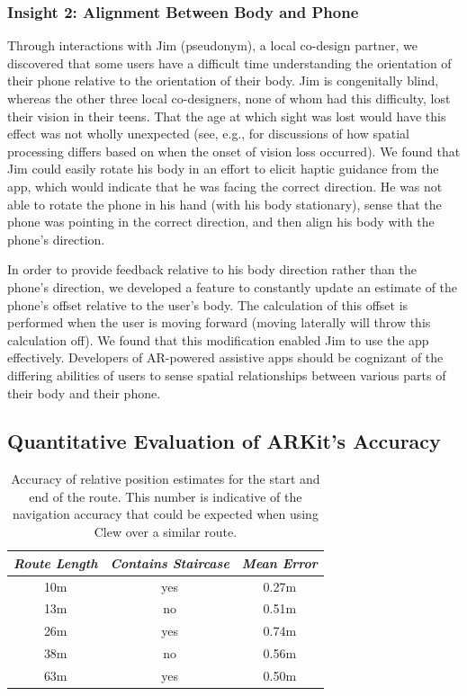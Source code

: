 \documentclass[chi]{sigchi}
\begin{document}
\subsubsection{Insight 2: Alignment Between Body and Phone}
Through interactions with Jim (pseudonym), a local co-design partner, we discovered that some users have a difficult time understanding the orientation of their phone relative to the orientation of their body.  Jim is congenitally blind, whereas the other three local co-designers, none of whom had this difficulty, lost their vision in their teens.  That the age at which sight was lost would have this effect was not wholly unexpected (see, e.g., \cite{long1997establishing, wiener2010foundations, schinazi2016spatial, thinus1997representation, williams2014just} for discussions of how spatial processing differs based on when the onset of vision loss occurred).  We found that Jim could easily rotate his body in an effort to elicit haptic guidance from the app, which would indicate that he was facing the correct direction.  He was not able to rotate the phone in his hand (with his body stationary), sense that the phone was pointing in the correct direction, and then align his body with the phone's direction.

In order to provide feedback relative to his body direction rather than the phone's direction, we developed a feature to constantly update an estimate of the phone's offset relative to the user's body.  The calculation of this offset is performed when the user is moving forward (moving laterally will throw this calculation off).  We found that this modification enabled Jim to use the app effectively.  Developers of AR-powered assistive apps should be cognizant of the differing abilities of users to sense spatial relationships between various parts of their body and their phone.

\subsection{Quantitative Evaluation of ARKit's Accuracy}

\begin{table}
  \centering
  \begin{tabular}{c c c}
    {\small \textit{Route Length}}
      & {\small \textit{Contains Staircase}}
        & {\small \textit{Mean Error}}  \\
    \midrule
    10m & yes  & 0.27m \\
    13m & no & 0.51m \\
    26m & yes & 0.74m \\
    38m & no & 0.56m \\
        63m & yes & 0.50m \\
  \end{tabular}
  \caption{Accuracy of relative position estimates for the start and end of the route.  This number is indicative of the navigation accuracy that could be expected when using Clew over a similar route.\label{tab:clewaccuracy}}%
\end{table}
\end{document}
